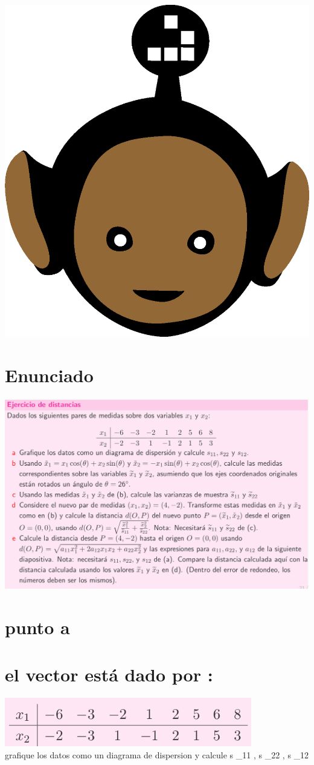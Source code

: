 \documentclass[10pt,a4paper]{article} %
\begin{document}
    \title{\rmfamily\normalfont{}}
    \author{}
    \date{\today} 
    
    \maketitle
     

    \includegraphics[width=0.1\linewidth]{negro_cara.png}
    \section{Enunciado}
        \includegraphics[width=0.8\linewidth]{enunciado_tarea.png}
    \section{punto a}
        \section{el vector está dado por :}
        \includegraphics[width=0.8\linewidth]{imagen_punto_a.png}
        \\ grafique los datos como un diagrama de dispersion y calcule s _{11} , s _{22} , s _{12}   
\end{document}

